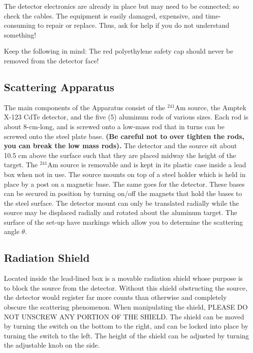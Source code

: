 \documentclass{../lab}
\begin{document}
The detector electronics are already in place but may need to be connected; so check the cables. The equipment is easily damaged, expensive, and time-consuming to repair or replace. Thus, ask for help if you do not understand something!

Keep the following in mind: The red polyethylene safety cap should never be removed from the detector face!

\subsection{Scattering Apparatus}

The main components of the Apparatus consist of the $^{241}$Am source, the Amptek X-123 CdTe detector, and the five (5) aluminum rods of various sizes. Each rod is about 8-cm-long, and is screwed onto a low-mass rod that in turns can be screwed onto the steel plate base. \textbf{(Be careful not to over tighten the rods, you can break the low mass rods).} The detector and the source sit about 10.5 cm above the surface such that they are placed midway the height of the target. The $^{241}$Am source is removable and is kept in its plastic case inside a lead box when not in use. The source mounts on top of a steel holder which is held in place by a post on a magnetic base. The same goes for the detector. These bases can be secured in position by turning on/off the magnets that hold the bases to the steel surface. The detector mount can only be translated radially while the source may be displaced radially and rotated about the aluminum target. The surface of the set-up have markings which allow you to determine the scattering angle $\theta$.

\subsection{Radiation Shield}

Located inside the lead-lined box is a movable radiation shield whose purpose is to block the source from the detector. Without this shield obstructing the source, the detector would register far more counts than otherwise and completely obscure the scattering phenomenon. When manipulating the shield, PLEASE DO NOT UNSCREW ANY PORTION OF THE SHIELD. The shield can be moved by turning the switch on the bottom to the right, and can be locked into place by turning the switch to the left. The height of the shield can be adjusted by turning the adjustable knob on the side.
\end{document}

